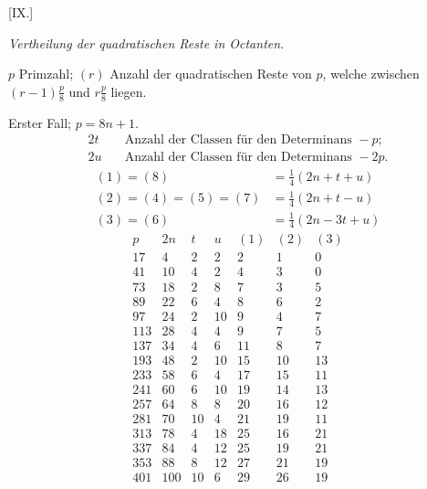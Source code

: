 %
\par\bigskip{}\centerline{[IX.]}\medskip
\begin{center}\emph{Vertheilung der quadratischen Reste in Octanten.}\end{center}
$p$ Primzahl; $(r)$ Anzahl der quadratischen Reste von $p$, welche zwischen $(r-1)\frac p8$ und $r\frac p8$ liegen.

Erster Fall; $p=8n+1$.
\[
\begin{aligned}
2t&\quad\text{Anzahl der Classen für den Determinans }-p;\\
2u&\quad\text{Anzahl der Classen für den Determinans }-2p.
\end{aligned}
\]
\[
\begin{aligned}
(1)=(8)&=\tfrac14(2n+t+u)\\
(2)=(4)=(5)=(7)&=\tfrac14(2n+t-u)\\
(3)=(6)&=\tfrac14(2n-3t+u)
\end{aligned}
\]
\[
\begin{array}{r|r|r|r|r|r|r}
p&2n&t&u&(1)&(2)&(3)\\\hline
17&4&2&2&2&1&0\\
41&10&4&2&4&3&0\\
73&18&2&8&7&3&5\\
89&22&6&4&8&6&2\\
97&24&2&10&9&4&7\\
113&28&4&4&9&7&5\\
137&34&4&6&11&8&7\\
193&48&2&10&15&10&13\\
233&58&6&4&17&15&11\\
241&60&6&10&19&14&13\\
257&64&8&8&20&16&12\\
281&70&10&4&21&19&11\\
313&78&4&18&25&16&21\\
337&84&4&12&25&19&21\\
353&88&8&12&27&21&19\\
401&100&10&6&29&26&19
\end{array}
\]

